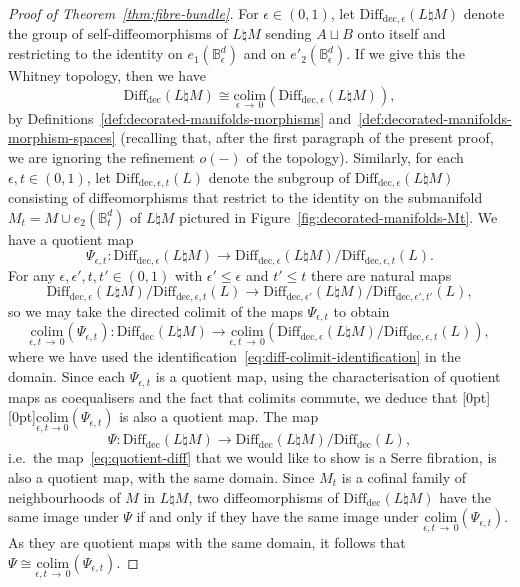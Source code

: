 \documentclass[10pt,a4paper]{amsart}
\numberwithin{equation}{section}
\newcommand{\colim}{\mathrm{colim}}
\newcommand{\rdec}{\mathrm{dec}}
\newcommand{\bB}{\mathbb{B}}
\newcommand{\too}{\ensuremath{\longrightarrow}}
\newcommand{\diffdec}{\ensuremath{\mathrm{Diff}_{\rdec}}}
\newcommand{\diffdece}{\ensuremath{\mathrm{Diff}_{\rdec,\epsilon}}}
\newcommand{\diffdeceprime}{\ensuremath{\mathrm{Diff}_{\rdec,\epsilon'}}}
\newcommand{\diffdecet}{\ensuremath{\mathrm{Diff}_{\rdec,\epsilon,t}}}
\newcommand{\diffdecetprime}{\ensuremath{\mathrm{Diff}_{\rdec,\epsilon',t'}}}
\renewcommand{\leq}{\leqslant}
\theoremstyle{definition}
\theoremstyle{remark}
\begin{document}
\begin{proof}[Proof of Theorem~\ref{thm:fibre-bundle}]
For $\epsilon \in (0,1)$, let $\diffdece(L\natural M)$ denote the group of self-diffeomorphisms of $L\natural M$ sending $A \sqcup B$ onto itself and restricting to the identity on $e_{1}(\bB_{\epsilon}^d)$ and on $e'_{2}(\bB_{\epsilon}^d)$. If we give this the Whitney topology, then we have
\begin{equation}\label{eq:diff-colimit-identification}
\diffdec(L\natural M) \cong \underset{\epsilon\,\to\,0}{\colim} (\diffdece(L\natural M)),
\end{equation}
by Definitions~\ref{def:decorated-manifolds-morphisms} and~\ref{def:decorated-manifolds-morphism-spaces} (recalling that, after the first paragraph of the present proof, we are ignoring the refinement $o(-)$ of the topology). Similarly, for each $\epsilon,t \in (0,1)$, let $\diffdecet(L)$ denote the subgroup of $\diffdece(L\natural M)$ consisting of diffeomorphisms that restrict to the identity on the submanifold $M_t = M \cup e_{2}(\bB_t^d)$ of $L\natural M$ pictured in Figure~\ref{fig:decorated-manifolds-Mt}. We have a quotient map
\[
\Psi_{\epsilon,t} \colon \diffdece(L\natural M) \too \diffdece(L\natural M) / \diffdecet(L).
\]
For any $\epsilon,\epsilon',t,t' \in (0,1)$ with $\epsilon' \leq \epsilon$ and $t' \leq t$ there are natural maps
\[
\diffdece(L\natural M) / \diffdecet(L) \too \diffdeceprime(L\natural M) / \diffdecetprime(L),
\]
so we may take the directed colimit of the maps $\Psi_{\epsilon,t}$ to obtain
\[
\underset{\epsilon,t\,\to\,0}{\colim}(\Psi_{\epsilon,t}) \colon \diffdec(L\natural M) \too \underset{\epsilon,t\,\to\,0}{\colim}\left(\diffdece(L\natural M) / \diffdecet(L)\right),
\]
where we have used the identification~\eqref{eq:diff-colimit-identification} in the domain. Since each $\Psi_{\epsilon,t}$ is a quotient map, using the characterisation of quotient maps as coequalisers and the fact that colimits commute, we deduce that \raisebox{0pt}[0pt][0pt]{$\underset{\epsilon,t\to 0}{\colim}(\Psi_{\epsilon,t})$} is also a quotient map. The map
\[
\Psi \colon \diffdec(L \natural M) \too \diffdec(L\natural M) / \diffdec(L),
\]
i.e.~the map~\eqref{eq:quotient-diff} that we would like to show is a Serre fibration, is also a quotient map, with the same domain. Since $M_t$ is a cofinal family of neighbourhoods of $M$ in $L \natural M$, two diffeomorphisms of $\diffdec(L \natural M)$ have the same image under $\Psi$ if and only if they have the same image under $\underset{\epsilon,t\,\to\,0}{\colim}(\Psi_{\epsilon,t})$. As they are quotient maps with the same domain, it follows that $\Psi \cong \underset{\epsilon,t\,\to\,0}{\colim}(\Psi_{\epsilon,t})$.


\end{proof}
\end{document}
